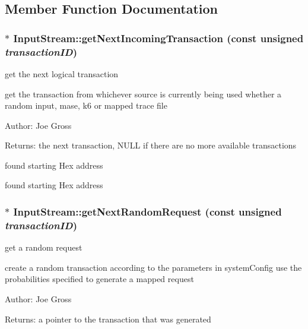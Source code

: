 \subsection{Member Function Documentation}
\subsubsection[{getNextIncomingTransaction}]{ $\ast$ InputStream::getNextIncomingTransaction (const unsigned {\em transactionID})}\label{class_d_r_a_msim_i_i_1_1_input_stream_0dcd689dfcc42d4fddb6bc325300a384}


get the next logical transaction 

get the transaction from whichever source is currently being used whether a random input, mase, k6 or mapped trace file \begin{Desc}
\item[Author:]Joe Gross \end{Desc}
\begin{Desc}
\item[Returns:]the next transaction, NULL if there are no more available transactions \end{Desc}


found starting Hex address

found starting Hex address 
\subsubsection[{getNextRandomRequest}]{ $\ast$ InputStream::getNextRandomRequest (const unsigned {\em transactionID})}\label{class_d_r_a_msim_i_i_1_1_input_stream_1d09b25ce313f34a0b1034582306ccef}


get a random request 

create a random transaction according to the parameters in systemConfig use the probabilities specified to generate a mapped request \begin{Desc}
\item[Author:]Joe Gross \end{Desc}
\begin{Desc}
\item[Returns:]a pointer to the transaction that was generated \end{Desc}
